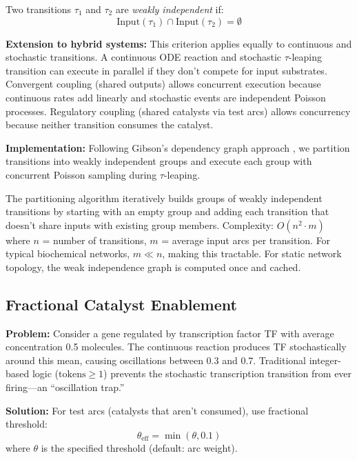 \documentclass{bioinfo}
\begin{document}
Two transitions $\tau_1$ and $\tau_2$ are \textit{weakly independent} if:
\begin{equation}
\text{Input}(\tau_1) \cap \text{Input}(\tau_2) = \emptyset
\end{equation}

\textbf{Extension to hybrid systems:} This criterion applies equally to continuous and stochastic transitions. A continuous ODE reaction and stochastic $\tau$-leaping transition can execute in parallel if they don't compete for input substrates. Convergent coupling (shared outputs) allows concurrent execution because continuous rates add linearly and stochastic events are independent Poisson processes. Regulatory coupling (shared catalysts via test arcs) allows concurrency because neither transition consumes the catalyst.

\textbf{Implementation:} Following Gibson's dependency graph approach \citep{gibson2000efficient}, we partition transitions into weakly independent groups and execute each group with concurrent Poisson sampling during $\tau$-leaping.

The partitioning algorithm iteratively builds groups of weakly independent transitions by starting with an empty group and adding each transition that doesn't share inputs with existing group members. Complexity: $O(n^2 \cdot m)$ where $n$ = number of transitions, $m$ = average input arcs per transition. For typical biochemical networks, $m \ll n$, making this tractable. For static network topology, the weak independence graph is computed once and cached.

\subsection{Fractional Catalyst Enablement}

\textbf{Problem:} Consider a gene regulated by transcription factor TF with average concentration 0.5 molecules. The continuous reaction produces TF stochastically around this mean, causing oscillations between 0.3 and 0.7. Traditional integer-based logic ($\text{tokens} \geq 1$) prevents the stochastic transcription transition from ever firing---an ``oscillation trap.''

\textbf{Solution:} For test arcs (catalysts that aren't consumed), use fractional threshold:
\begin{equation}
\theta_{\text{eff}} = \min(\theta, 0.1)
\end{equation}
where $\theta$ is the specified threshold (default: arc weight).
\end{document}
